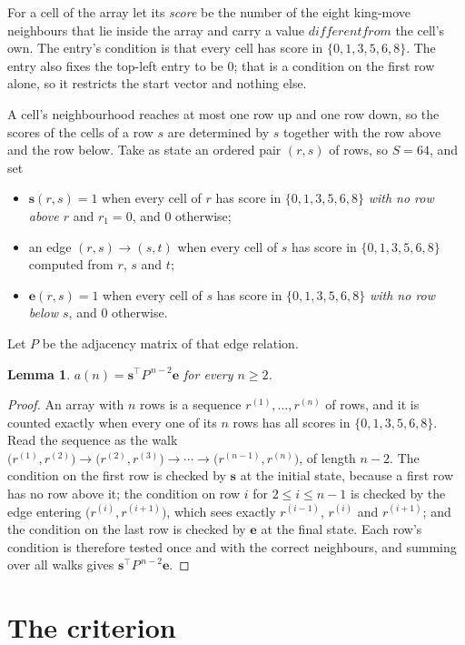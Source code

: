 \documentclass[11pt,a4paper]{article}
\theoremstyle{plain}
\newtheorem{lemma}[theorem]{Lemma}
\theoremstyle{definition}
\begin{document}
For a cell of the array let its \emph{score} be the number of the eight king-move neighbours that lie inside
the array and carry a value $different from$ the cell's own. The entry's condition is that every cell
has score in $\{0,1,3,5,6,8\}$. The entry also fixes the top-left entry to be $0$; that is a condition on the first row alone, so it restricts the start vector and nothing else.

A cell's neighbourhood reaches at most one row up and one row down, so the scores of the
cells of a row $s$ are determined by $s$ together with the row above and the row below.
Take as state an ordered pair $(r,s)$ of rows, so $S=64$, and set
\begin{itemize}
\item $\mathbf{s}(r,s)=1$ when every cell of $r$ has score in $\{0,1,3,5,6,8\}$ \emph{with no row
above $r$} and $r_1=0$, and $0$ otherwise;
\item an edge $(r,s)\to(s,t)$ when every cell of $s$ has score in $\{0,1,3,5,6,8\}$ computed from
$r$, $s$ and $t$;
\item $\mathbf{e}(r,s)=1$ when every cell of $s$ has score in $\{0,1,3,5,6,8\}$ \emph{with no row
below $s$}, and $0$ otherwise.
\end{itemize}
Let $P$ be the adjacency matrix of that edge relation.

\begin{lemma}\label{lem:walk}
$a(n)=\mathbf{s}^{\!\top}P^{\,n-2}\mathbf{e}$ for every $n\ge2$.
\end{lemma}

\begin{proof}
An array with $n$ rows is a sequence $r^{(1)},\dots,r^{(n)}$ of rows, and it is counted
exactly when every one of its $n$ rows has all scores in $\{0,1,3,5,6,8\}$. Read the sequence as the
walk $\bigl(r^{(1)},r^{(2)}\bigr)\to\bigl(r^{(2)},r^{(3)}\bigr)\to\cdots\to
\bigl(r^{(n-1)},r^{(n)}\bigr)$, of length $n-2$. The condition on the first row is
checked by $\mathbf{s}$ at the initial state, because a first row has no row above it; the
condition on row $i$ for $2\le i\le n-1$ is checked by the edge entering
$\bigl(r^{(i)},r^{(i+1)}\bigr)$, which sees exactly $r^{(i-1)}$, $r^{(i)}$ and
$r^{(i+1)}$; and the condition on the last row is checked by $\mathbf{e}$ at the final
state. Each row's condition is therefore tested once and with the correct neighbours, and
summing over all walks gives $\mathbf{s}^{\!\top}P^{\,n-2}\mathbf{e}$.
\end{proof}

\section{The criterion}
\end{document}
